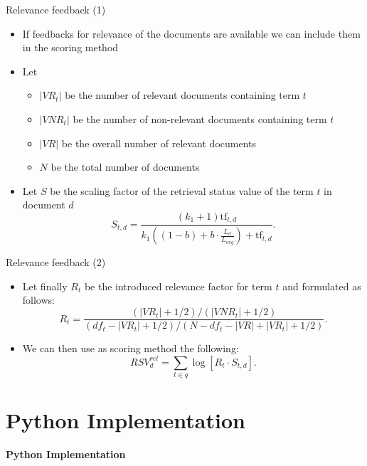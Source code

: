 \documentclass[]{beamer}
\begin{document}
\begin{frame}{Relevance feedback (1)}
    \begin{itemize}
        \item If feedbacks for relevance of the documents are available we can include them in the scoring method
        \item Let 
        \begin{itemize}
            \item $|VR_t|$ be the number of relevant documents containing term $t$
            \item $|VNR_t|$ be the number of non-relevant documents containing term $t$
            \item $|VR|$ be the overall number of relevant documents
            \item $N$ be the total number of documents
        \end{itemize}
        \item Let $S$ be the scaling factor of the retrieval status value of the term $t$ in document $d$
        \begin{equation*}
            S_{t,d} =  \frac{(k_1 + 1) \text{tf}_{t,d}}{k_1((1-b)+b \cdot \frac{L_d}{L_{avg}})+\text{tf}_{t,d}}.
        \end{equation*}
    \end{itemize}
\end{frame}

\begin{frame}{Relevance feedback (2)}
    \begin{itemize}
        \item Let finally $R_t$ be the introduced relevance factor for term $t$ and formulated as follows:
        \begin{equation*}
            R_t = \frac{(|VR_t|+1/2)/(|VNR_t|+1/2)}{(df_t - |VR_t|+1/2)/(N-df_t -|VR| + |VR_t|+1/2)}.
        \end{equation*} 
        \item We can then use as scoring method the following:
        \begin{equation*}
            RSV^{rel}_d = \sum_{t \in q} \log \left[R_t \cdot S_{t,d}\right].
        \end{equation*}
    \end{itemize}
\end{frame}



\section{Python Implementation}
\begin{frame}
    \begin{block}{}
        \centering
        \huge{\textbf{Python Implementation}}
    \end{block}
\end{frame}
\end{document}
